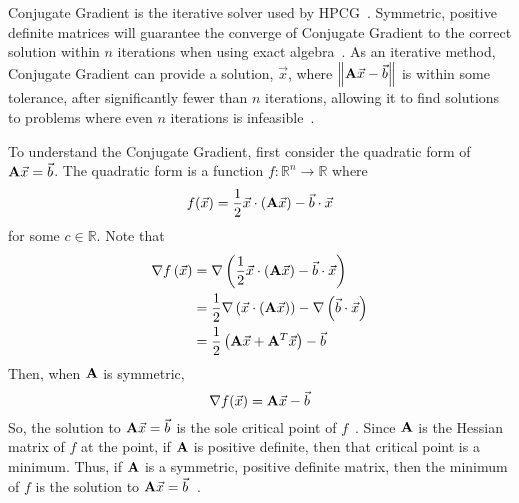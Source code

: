 Conjugate Gradient is the iterative solver used by HPCG~\cite{Dongarra:2015:HPCG}.
Symmetric, positive definite matrices will guarantee the converge of Conjugate Gradient to the correct solution within \(n\) iterations when using exact algebra~\cite{Saad:2003:IterativeMethods}.
As an iterative method, Conjugate Gradient can provide a solution, \(\vec{x}\), where \(\left\|\mathbf{A}\vec{x}-\vec{b}\right\|\) is within some tolerance, after significantly fewer than \(n\) iterations, allowing it to find solutions to problems where even \(n\) iterations is infeasible~\cite{Shewchuk:1994:IntroToCG}.

To understand the Conjugate Gradient, first consider the quadratic form of \(\mathbf{A}\vec{x} = \vec{b}\).
The quadratic form is a function \(f:\mathbb{R}^n\to\mathbb{R}\) where
\begin{equation}
\label{eq:quad-form}
	f(\vec{x}) = \frac{1}{2}\vec{x}\cdot\left(\mathbf{A}\vec{x}\right) - \vec{b}\cdot\vec{x}
\end{equation}
for some \(c\in\mathbb{R}\).
Note that
\begin{align*}
	\nabla f\left(\vec{x}\right)
	&= \nabla \left(\frac{1}{2}\vec{x}\cdot\left(\mathbf{A}\vec{x}\right) - \vec{b}\cdot\vec{x}\right) \\
	&= \frac{1}{2}\nabla \left(\vec{x}\cdot\left(\mathbf{A}\vec{x}\right)\right) - \nabla\left(\vec{b}\cdot\vec{x}\right) \\
	&= \frac{1}{2}\left(\mathbf{A}\vec{x}+\mathbf{A}^T\vec{x}\right)-\vec{b}
\end{align*}
Then, when \(\mathbf{A}\) is symmetric,
\begin{equation*}
	\nabla f(\vec{x}) = \mathbf{A}\vec{x} - \vec{b}
\end{equation*}
So, the solution to \(\mathbf{A}\vec{x} = \vec{b}\) is the sole critical point of \(f\)~\cite{Nearing:2010:toolsForPhysics}.
Since \(\mathbf{A}\) is the Hessian matrix of \(f\) at the point, if \(\mathbf{A}\) is positive definite, then that critical point is a minimum.
Thus, if \(\mathbf{A}\) is a symmetric, positive definite matrix, then the minimum of \(f\) is the solution to \(\mathbf{A}\vec{x} = \vec{b}\)~\cite{Shewchuk:1994:IntroToCG}.

